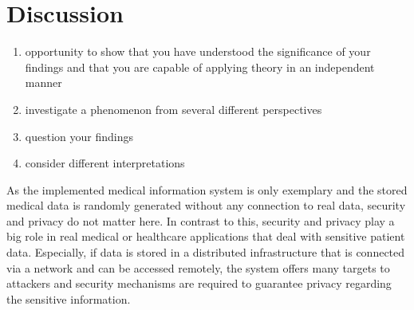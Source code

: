 
\section{Discussion}
\label{sec:disc}

\begin{enumerate}
    \item opportunity to show that you have understood the significance of your findings and that you are capable of applying theory in an independent manner
    \item investigate a phenomenon from several different perspectives
    \item question your findings
    \item consider different interpretations
\end{enumerate}


As the implemented medical information system is only exemplary and the stored medical data is randomly generated without any connection to real data, security and
privacy do not matter here. In contrast to this, security and privacy play a big role in real medical or healthcare applications that deal with sensitive patient
data. Especially, if data is stored in a distributed infrastructure that is connected via a network and can be accessed remotely, the system offers many targets
to attackers and security mechanisms are required to guarantee privacy regarding the sensitive information.

